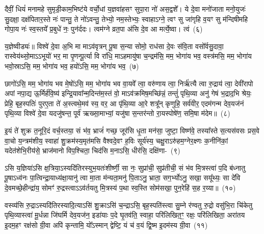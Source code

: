 {\anuvakamend[{मा॒ योनि॑रसि त्रि॒ꣳ॒शच्च॑}]}%

दैवीं॒ धियं॑ मनामहे सुमृडी॒काम॒भिष्ट॑ये वर्चो॒धां य॒ज्ञवा॑हसꣳ सुपा॒रा नो॑ अस॒द्वशे᳚। ये दे॒वा मनो॑जाता मनो॒युजः॑ सु॒दक्षा॒ दक्ष॑पितार॒स्ते नः॑ पान्तु॒ ते नो॑\-ऽवन्तु॒ तेभ्यो॒ नम॒स्तेभ्यः॒ स्वाहा\-ऽग्ने॒ त्वꣳ सु जा॑गृहि व॒यꣳ सु म॑न्दिषीमहि गोपा॒य नः॑ स्व॒स्तये᳚ प्र॒बुधे॑ नः॒ पुन॑र्ददः। त्वम॑ग्ने व्रत॒पा अ॑सि दे॒व आ मर्त्ये॒ष्वा। त्वं~(६)

य॒ज्ञेष्वीड्यः॑॥ विश्वे॑ दे॒वा अ॒भि मा मा\-ऽव॑वृत्रन् पू॒षा स॒न्या सोमो॒ राध॑सा दे॒वः स॑वि॒ता वसो᳚र्वसु॒दावा॒ रास्वेय॑थ्सो॒मा\-ऽ\-ऽभूयो॑ भर॒ मा पृ॒णन्पू॒र्त्या वि रा॑धि॒ मा\-ऽहमायु॑षा च॒न्द्रम॑सि॒ मम॒ भोगा॑य भव॒ वस्त्र॑मसि॒ मम॒ भोगा॑य भवो॒स्रा\-ऽसि॒ मम॒ भोगा॑य भव॒ हयो॑\-ऽसि॒ मम॒ भोगा॑य भव॒~(७)

छागो॑\-ऽसि॒ मम॒ भोगा॑य भव मे॒षो॑\-ऽसि॒ मम॒ भोगा॑य भव वा॒यवे᳚ त्वा॒ वरु॑णाय त्वा॒ निर्\mbox{}ऋ॑त्यै त्वा रु॒द्राय॑ त्वा॒ देवी॑रापो अपां नपा॒द्य ऊ॒र्मिर्\mbox{}ह॑वि॒ष्य॑ इन्द्रि॒यावा᳚न्म॒दिन्त॑म॒स्तं वो॒ मा\-ऽव॑क्रमिष॒मच्छि॑न्नं॒ तन्तुं॑ पृथि॒व्या अनु॑ गेषं भ॒द्राद॒भि श्रेयः॒ प्रेहि॒ बृह॒स्पतिः॑ पुरए॒ता ते॑ अ॒स्त्वथे॒मव॑ स्य॒ वर॒ आ पृ॑थि॒व्या आ॒रे शत्रू᳚न् कृणुहि॒ सर्व॑वीर॒ एदम॑गन्म देव॒यज॑नं पृथि॒व्या विश्वे॑ दे॒वा यदजु॑षन्त॒ पूर्व॑ ऋख्सा॒माभ्यां॒ यजु॑षा स॒न्तर॑न्तो रा॒यस्पोषे॑ण॒ समि॒षा म॑देम॥~(८)

{\anuvakamend[{आ त्वꣳ हयो॑\-ऽसि॒ मम॒ भोगा॑य भव स्य॒ पञ्च॑विꣳशतिश्च}]}%

इ॒यं ते॑ शुक्र त॒नूरि॒दं वर्च॒स्तया॒ सं भ॑व॒ भ्राजं॑ गच्छ॒ जूर॑सि धृ॒ता मन॑सा॒ जुष्टा॒ विष्ण॑वे॒ तस्या᳚स्ते स॒त्यस॑वसः प्रस॒वे वा॒चो य॒न्त्रम॑शीय॒ स्वाहा॑ शु॒क्रम॑स्य॒मृत॑मसि वैश्वदे॒वꣳ ह॒विः सूर्य॑स्य॒ चक्षु॒रा\-ऽरु॑हम॒ग्नेर॒क्ष्णः क॒नीनि॑कां॒ यदेत॑शेभि॒रीय॑से॒ भ्राज॑मानो विप॒श्चिता॒ चिद॑सि म॒ना\-ऽसि॒ धीर॑सि॒ दक्षि॑णा-~(९)

ऽसि य॒ज्ञिया॑\-ऽसि क्ष॒त्रिया॒\-ऽस्यदि॑तिरस्युभ॒यतः॑शीर्ष्णी॒ सा नः॒ सुप्रा॑ची॒ सुप्र॑तीची॒ सं भ॑व मि॒त्रस्त्वा॑ प॒दि ब॑ध्नातु पू॒षा\-ऽध्व॑नः पा॒त्विन्द्रा॒याध्य॑क्षा॒यानु॑ त्वा मा॒ता म॑न्यता॒मनु॑ पि॒ता\-ऽनु॒ भ्राता॒ सग॒र्भ्यो\-ऽनु॒ सखा॒ सयू᳚थ्यः॒ सा दे॑वि दे॒वमच्छे॒हीन्द्रा॑य॒ सोमꣳ॑ रु॒द्रस्त्वा\-ऽ\-ऽव॑र्तयतु मि॒त्रस्य॑ प॒था स्व॒स्ति सोम॑सखा॒ पुन॒रेहि॑ स॒ह र॒य्या॥~(१०)

{\anuvakamend[{दक्षि॑णा॒ सोम॑सखा॒ पञ्च॑ च}]}%

वस्व्य॑सि रु॒द्रा\-ऽस्यदि॑तिरस्यादि॒त्या\-ऽसि॑ शु॒क्रा\-ऽसि॑ च॒न्द्रा\-ऽसि॒ बृह॒स्पति॑स्त्वा सु॒म्ने र॑ण्वतु रु॒द्रो वसु॑भि॒रा चि॑केतु पृथि॒व्यास्त्वा॑ मू॒र्धन्ना जि॑घर्मि देव॒यज॑न॒ इडा॑याः प॒दे घृ॒तव॑ति॒ स्वाहा॒ परि॑लिखित॒ꣳ॒ रक्षः॒ परि॑लिखिता॒ अरा॑तय इ॒दम॒हꣳ रक्ष॑सो ग्री॒वा अपि॑ कृन्तामि॒ यो᳚\-ऽस्मान् द्वेष्टि॒ यं च॑ व॒यं द्वि॒ष्म इ॒दम॑स्य ग्री॒वा~(११)

